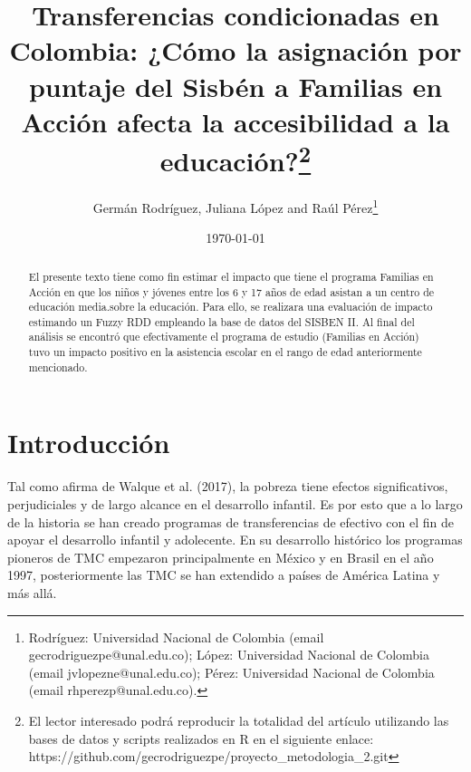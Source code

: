 \documentclass[AER]{AEA}
\begin{document}
\title{Transferencias condicionadas en Colombia: ¿Cómo la asignación por puntaje del Sisbén a Familias en Acción afecta la accesibilidad a la educación?\footnote{El lector interesado podrá reproducir la totalidad del artículo utilizando las bases de datos y scripts realizados en R en el siguiente enlace: https://github.com/gecrodriguezpe/proyecto_metodologia_2.git}}
\author{Germán Rodríguez, Juliana López and Raúl Pérez\thanks{Rodríguez: Universidad Nacional de Colombia (email gecrodriguezpe@unal.edu.co); López: Universidad Nacional de Colombia (email jvlopezne@unal.edu.co); Pérez: Universidad Nacional de Colombia (email rhperezp@unal.edu.co).}}
\date{\today}

\begin{abstract}
El presente texto tiene como fin estimar el impacto que tiene el programa Familias en Acción en que los niños y jóvenes entre los 6 y 17 años de edad asistan a un centro de educación media.sobre la educación. Para ello, se realizara una  evaluación de impacto estimando un Fuzzy RDD empleando la base de datos del SISBEN II. Al final del análisis se encontró que efectivamente el programa de estudio (Familias en Acción) tuvo un impacto positivo en la asistencia escolar en el rango de edad anteriormente mencionado.
\end{abstract}


\maketitle

\section{Introducción}
    
Tal como afirma de Walque et al. (2017), la pobreza tiene efectos significativos, perjudiciales y de largo alcance  en  el  desarrollo  infantil.   Es  por  esto que  a  lo  largo  de  la  historia  se  han  creado  programas  de transferencias de efectivo con el fin de apoyar el desarrollo infantil y adolecente. En su desarrollo histórico los programas pioneros de TMC empezaron principalmente en México y en Brasil en el año 1997, posteriormente las TMC se han extendido a países de América Latina y más allá.
    
\end{document}
